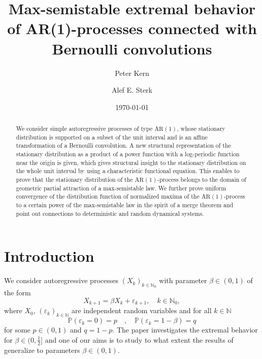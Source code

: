 \documentclass[12pt]{amsart}
\title[Max-semistable extremal behavior of AR(1)-processes]{Max-semistable extremal behavior of AR(1)-processes connected with Bernoulli convolutions}
\author[P. Kern]{Peter Kern}
\author[A.E. Sterk]{Alef E. Sterk}
\date{\today}
\theoremstyle{definition}
\theoremstyle{remark}
\newcommand{\nat}{{\mathbb N}}
\newcommand{\AR}{\operatorname{AR(1)}}
\newcommand{\eps}{{\varepsilon}}
\newcommand{\Pm}{{\mathbb P}}
\numberwithin{equation}{section}
\begin{document}
\allowdisplaybreaks

\begin{abstract}
We consider simple autoregressive processes of type $\AR$, whose stationary distribution is supported on a subset of the unit interval and is an affine transformation of a Bernoulli convolution. A new structural representation of the stationary distribution as a product of a power function with a log-periodic function near the origin is given, which gives structural insight to the stationary distribution on the whole unit interval by using a characteristic functional equation. This enables to prove that the stationary distribution of the $\AR$-process belongs to the domain of geometric partial attraction of a max-semistable law. We further prove uniform convergence of the distribution function of normalized maxima of the $\AR$-process to a certain power of the max-semistable law in the spirit of a merge theorem and point out connections to deterministic and random dynamical systems.
\end{abstract}



\maketitle

\section{Introduction}

We consider autoregressive processes $(X_{k})_{k\in\nat_{0}}$ with parameter $\beta\in(0,1)$ of the form
\begin{equation}\label{ar1}
X_{k+1}=\beta X_{k}+\eps_{k+1},\quad k\in\nat_{0},
\end{equation}
where $X_{0}$, $(\eps_{k})_{k\in\nat}$ are independent random variables and for all $k\in\nat$
\begin{equation*}
\Pm(\eps_{k}=0)=p\quad , \quad \Pm(\eps_{k}=1-\beta)=q
\end{equation*}
for some $p\in(0,1)$ and $q=1-p$. The paper \cite{Sterk} investigates the extremal behavior for $\beta\in(0,\frac12]$ and one of our aims is to study to what extent the results of \cite{Sterk} generalize to parameters $\beta\in(0,1)$.
\end{document}
